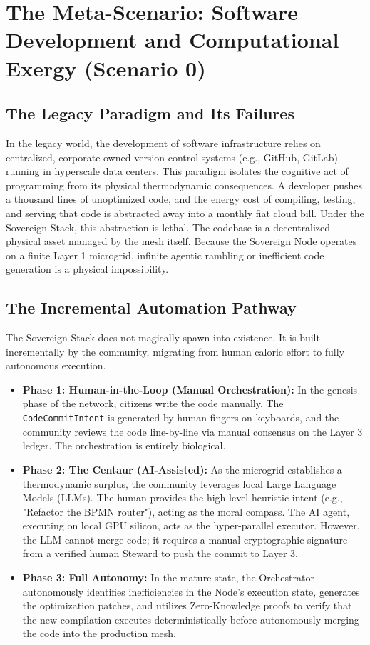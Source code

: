 \chapter{The Meta-Scenario: Software Development and Computational Exergy (Scenario 0)}

\section{The Legacy Paradigm and Its Failures}
In the legacy world, the development of software infrastructure relies on centralized, corporate-owned version control systems (e.g., GitHub, GitLab) running in hyperscale data centers. This paradigm isolates the cognitive act of programming from its physical thermodynamic consequences. A developer pushes a thousand lines of unoptimized code, and the energy cost of compiling, testing, and serving that code is abstracted away into a monthly fiat cloud bill. Under the Sovereign Stack, this abstraction is lethal. The codebase is a decentralized physical asset managed by the mesh itself. Because the Sovereign Node operates on a finite Layer 1 microgrid, infinite agentic rambling or inefficient code generation is a physical impossibility. 

\section{The Incremental Automation Pathway}
The Sovereign Stack does not magically spawn into existence. It is built incrementally by the community, migrating from human caloric effort to fully autonomous execution.
\begin{itemize}
    \item \textbf{Phase 1: Human-in-the-Loop (Manual Orchestration):} In the genesis phase of the network, citizens write the code manually. The \texttt{CodeCommitIntent} is generated by human fingers on keyboards, and the community reviews the code line-by-line via manual consensus on the Layer 3 ledger. The orchestration is entirely biological.
    \item \textbf{Phase 2: The Centaur (AI-Assisted):} As the microgrid establishes a thermodynamic surplus, the community leverages local Large Language Models (LLMs). The human provides the high-level heuristic intent (e.g., "Refactor the BPMN router"), acting as the moral compass. The AI agent, executing on local GPU silicon, acts as the hyper-parallel executor. However, the LLM cannot merge code; it requires a manual cryptographic signature from a verified human Steward to push the commit to Layer 3.
    \item \textbf{Phase 3: Full Autonomy:} In the mature state, the Orchestrator autonomously identifies inefficiencies in the Node's execution state, generates the optimization patches, and utilizes Zero-Knowledge proofs to verify that the new compilation executes deterministically before autonomously merging the code into the production mesh.
\end{itemize}

